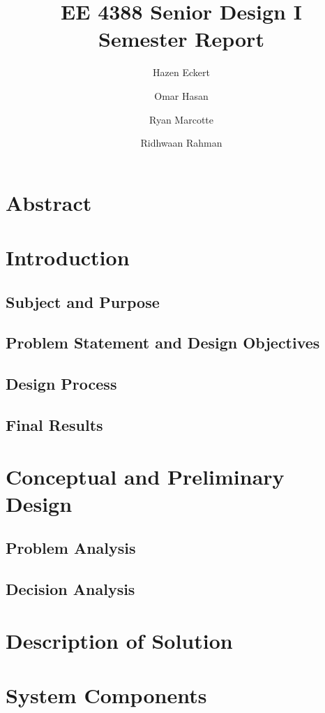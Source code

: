 \documentclass[letterpaper,12pt]{article}
\begin{document}
\title{EE 4388 Senior Design I\\Semester Report}
\author{Hazen Eckert \and Omar Hasan \and Ryan Marcotte \and Ridhwaan Rahman}
\maketitle
\tableofcontents

\section{Abstract}
\section{Introduction}
\subsection{Subject and Purpose}
\subsection{Problem Statement and Design Objectives}
\subsection{Design Process}
\subsection{Final Results}

\section{Conceptual and Preliminary Design}
\subsection{Problem Analysis}
\subsection{Decision Analysis}

\section{Description of Solution}

\section{System Components}
\end{document}
